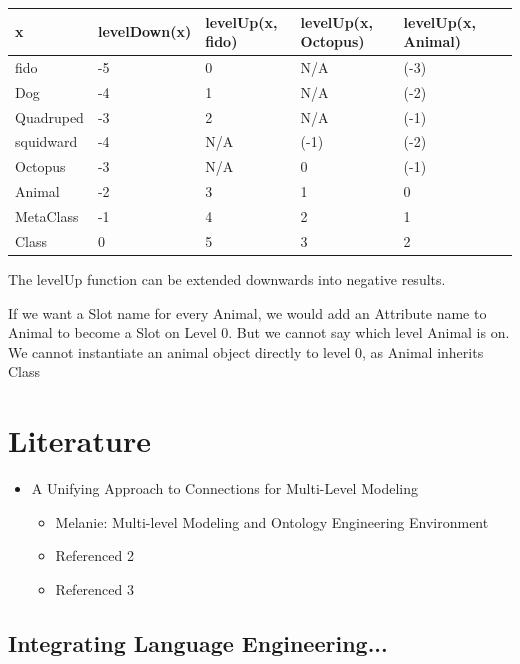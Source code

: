 \documentclass{scrreprt}
\newcounter{myCounter}[subsubsection]
\newcommand{\layerOne}[1]{\chapter{#1}}
\newcommand{\layerTwo}[1]{\section{#1} \setcounter{myCounter}{0}}
\begin{document}
\begin{tabular}[t]{|l|l|l|l|l|l|} \hline
x&levelDown(x)&levelUp(x, fido)&levelUp(x, Octopus)&levelUp(x, Animal) \\\hline
fido 				&-5&  0& N/A&(-3) \\\hline
Dog 				&-4&  1& N/A&(-2) \\\hline
Quadruped 	&-3&  2& N/A&(-1) \\\hline
squidward 	&-4&N/A&(-1)&(-2) \\\hline
Octopus 	  &-3&N/A&   0&(-1) \\\hline
Animal 			&-2&  3&   1&   0 \\\hline
MetaClass 	&-1&  4&   2&   1 \\\hline
Class 			& 0&  5&   3&   2 \\\hline
\hline
\end{tabular}

The levelUp function can be extended downwards into negative results.

\vspace{5mm}

If we want a Slot name for every Animal, we would add an Attribute name to Animal to become a Slot on Level 0. But we cannot say which level Animal is on.\\
We cannot instantiate an animal object directly to level 0, as Animal inherits Class


\layerOne{Literature}

\begin{itemize}
  \item A Unifying Approach to Connections for Multi-Level Modeling
  \cite{article:AtkinsonGerbigKuehne2015}
  \begin{itemize}
  \item Melanie: Multi-level Modeling and Ontology Engineering
  Environment \cite{article:AtkinsonGerbig2012}
  \item Referenced 2
  \item Referenced 3
\end{itemize}
\end{itemize}

\layerTwo{Integrating Language Engineering\cite{article:ClarkFrank0000}...}




\nocite{article:test}




\clearpage
{}
{}


\end{document}

